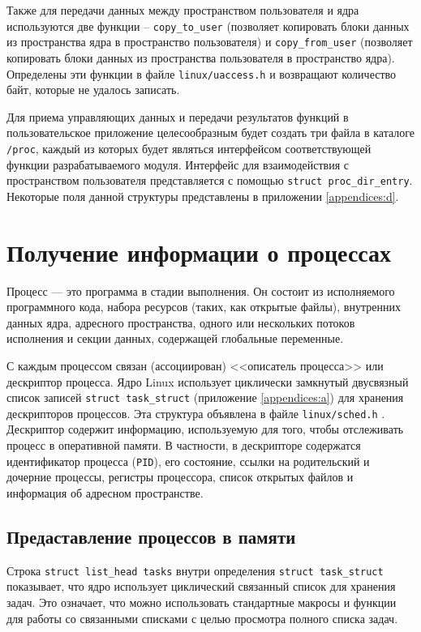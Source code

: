 Также для передачи данных между пространством пользователя и ядра используются две функции -- \texttt{copy\_to\_user} (позволяет копировать блоки данных из пространства ядра в пространство пользователя) и \texttt{copy\_from\_user} (позволяет копировать блоки данных из пространства пользователя в пространство ядра). Определены эти функции в файле \texttt{linux/uaccess.h} \cite{uaccess} и возвращают количество байт, которые не удалось записать.

Для приема управляющих данных и передачи результатов функций в пользовательское приложение целесообразным будет создать три файла в каталоге \texttt{/proc}, каждый из которых будет являться интерфейсом соответствующей функции разрабатываемого модуля. Интерфейс для взаимодействия с пространством пользователя представляется с помощью \texttt{struct proc\_dir\_entry}. Некоторые поля данной структуры представлены в приложении \ref{appendices:d}. 


\section{Получение информации о процессах}

Процесс --- это программа в стадии выполнения. Он состоит из исполняемого программного кода, набора ресурсов (таких, как открытые файлы), внутренних данных ядра, адресного пространства, одного или нескольких потоков исполнения и секции данных, содержащей глобальные переменные. 

С каждым процессом связан (ассоциирован) <<описатель процесса>> или дескриптор процесса. Ядро Linux использует циклически замкнутый двусвязный список записей \texttt{struct task\_struct} (приложение \ref{appendices:a}) для хранения дескрипторов процессов. Эта структура объявлена в файле \texttt{linux/sched.h} \cite{sched}. Дескриптор содержит информацию, используемую для того, чтобы отслеживать процесс в оперативной памяти. В частности, в дескрипторе содержатся идентификатор процесса (\texttt{PID}), его состояние, ссылки на родительский и дочерние процессы, регистры процессора, список открытых файлов и информация об адресном пространстве.


\subsection{Предаставление процессов в памяти}

Строка \texttt{struct list\_head tasks} внутри определения \texttt{struct task\_struct} показывает, что ядро использует циклический связанный список для хранения задач. Это означает, что можно использовать стандартные макросы и функции для работы со связанными списками с целью просмотра полного списка задач. 

